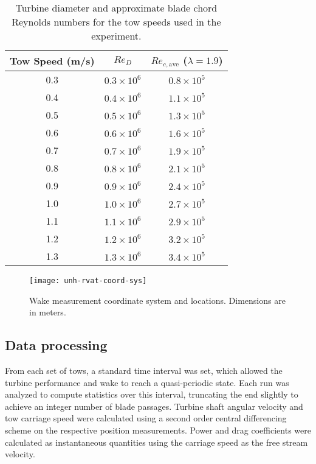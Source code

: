\begin{table}[ht]
\centering
\begin{tabular}{c|c|c}
    Tow Speed (m/s) & $Re_D$ & $Re_{c,\mathrm{ave}}$ ($\lambda = 1.9$) \\
    \hline
    0.3 & $0.3 \times 10^6$ & $0.8 \times 10^5$ \\
    0.4 & $0.4 \times 10^6$ & $1.1 \times 10^5$ \\
    0.5 & $0.5 \times 10^6$ & $1.3 \times 10^5$ \\
    0.6 & $0.6 \times 10^6$ & $1.6 \times 10^5$ \\
    0.7 & $0.7 \times 10^6$ & $1.9 \times 10^5$ \\
    0.8 & $0.8 \times 10^6$ & $2.1 \times 10^5$ \\
    0.9 & $0.9 \times 10^6$ & $2.4 \times 10^5$ \\
    1.0 & $1.0 \times 10^6$ & $2.7 \times 10^5$ \\
    1.1 & $1.1 \times 10^6$ & $2.9 \times 10^5$ \\
    1.2 & $1.2 \times 10^6$ & $3.2 \times 10^5$ \\
    1.3 & $1.3 \times 10^6$ & $3.4 \times 10^5$ \\
\end{tabular}
\caption{Turbine diameter and approximate blade chord Reynolds numbers for the
    tow speeds used in the experiment.}
\label{tab:Re}
\end{table}
\unskip


\begin{figure}
    \centering

    \texttt{[image: unh-rvat-coord-sys]}

    \caption{Wake measurement coordinate system and locations. Dimensions are in
        meters.}

    \label{fig:wake-locations}
\end{figure}


\subsection{Data processing}

From each set of tows, a standard time interval was set, which allowed the
turbine performance and wake to reach a quasi-periodic state. Each run was
analyzed to compute statistics over this interval, truncating the end slightly
to achieve an integer number of blade passages. Turbine shaft angular velocity
and tow carriage speed were calculated using a second order central differencing
scheme on the respective position measurements. Power and drag coefficients were
calculated as instantaneous quantities using the carriage speed as the free
stream velocity.

